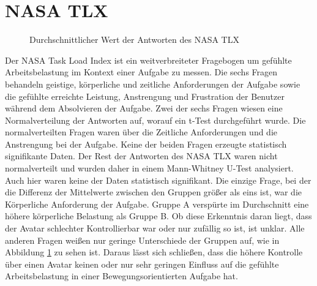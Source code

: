 \section{NASA TLX}
\begin{figure}[h]
  \caption[Durchschnittlicher Wert der Antworten des NASA TLX]{Durchschnittlicher Wert der Antworten des NASA TLX}
  \label{fig:TLXScores}
\end{figure}
Der NASA Task Load Index \cite{HART1988} ist ein weitverbreiteter Fragebogen um gefühlte Arbeitsbelastung im Kontext einer Aufgabe zu messen. Die sechs Fragen behandeln geistige, körperliche und zeitliche Anforderungen der Aufgabe sowie die gefühlte erreichte Leistung, Anstrengung und Frustration der Benutzer während dem Absolvieren der Aufgabe. Zwei der sechs Fragen wiesen eine Normalverteilung der Antworten auf, worauf ein t-Test durchgeführt wurde. Die normalverteilten Fragen waren über die Zeitliche Anforderungen und die Anstrengung bei der Aufgabe. Keine der beiden Fragen erzeugte statistisch signifikante Daten. Der Rest der Antworten des NASA TLX waren nicht normalverteilt und wurden daher in einem Mann-Whitney U-Test analysiert. Auch hier waren keine der Daten statistisch signifikant. Die einzige Frage, bei der die Differenz der Mittelwerte zwischen den Gruppen größer als eins ist, war die Körperliche Anforderung der Aufgabe. Gruppe A verspürte im Durchschnitt eine höhere körperliche Belastung als Gruppe B. Ob diese Erkenntnis daran liegt, dass der Avatar schlechter Kontrollierbar war oder nur zufällig so ist, ist unklar. Alle anderen Fragen weißen nur geringe Unterschiede der Gruppen auf, wie in Abbildung \ref{fig:TLXScores} zu sehen ist. Daraus lässt sich schließen, dass die höhere Kontrolle über einen Avatar keinen oder nur sehr geringen Einfluss auf die gefühlte Arbeitsbelastung in einer Bewegungsorientierten Aufgabe hat.


